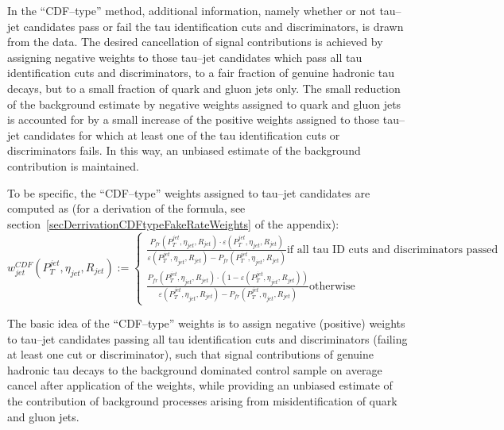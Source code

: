 In the ``CDF--type'' method, additional information, namely whether or not
tau--jet candidates pass or fail the tau identification cuts and discriminators,
is drawn from the data.  The desired cancellation of signal contributions is
achieved by assigning negative weights to those tau--jet candidates which pass
all tau identification cuts and discriminators, \ie to a fair fraction of
genuine hadronic tau decays, but to a small fraction of quark and gluon jets
only.  The small reduction of the background estimate by negative weights
assigned to quark and gluon jets is accounted for by a small increase of the
positive weights assigned to those tau--jet candidates for which at least one of
the tau identification cuts or discriminators fails.  In this way, an unbiased
estimate of the background contribution is maintained.

To be specific, the ``CDF--type'' weights assigned to tau--jet candidates are computed as
(for a derivation of the formula, see section~\ref{secDerrivationCDFtypeFakeRateWeights} of the appendix):
\begin{equation}
w_{jet}^{CDF} \left( P_{T}^{jet}, \eta_{jet}, R_{jet} \right) 
:= 
\begin{cases} 
   \frac{P_{fr} \left( P_{T}^{jet}, \eta_{jet}, R_{jet} \right) \cdot 
         \varepsilon \left( P_{T}^{jet}, \eta_{jet}, R_{jet} \right)}
        {\varepsilon \left( P_{T}^{jet}, \eta_{jet}, R_{jet} \right) - P_{fr} \left( P_{T}^{jet}, \eta_{jet}, R_{jet} \right)}
      \mbox{if all tau ID cuts and discriminators passed} \\
   \frac{P_{fr} \left( P_{T}^{jet}, \eta_{jet}, R_{jet} \right) \cdot 
         \left( 1 - \varepsilon \left( P_{T}^{jet}, \eta_{jet}, R_{jet} \right) \right)}
        {\varepsilon \left( P_{T}^{jet}, \eta_{jet}, R_{jet} \right) - P_{fr} \left( P_{T}^{jet}, \eta_{jet}, R_{jet} \right)}
      \mbox{otherwise}
\end{cases}
\label{eqBgEstFakeRate_frCDFtypeJetWeight}
\end{equation}

The basic idea of the ``CDF--type'' weights is to assign negative (positive)
weights to tau--jet candidates passing all tau identification cuts and
discriminators (failing at least one cut or discriminator), such that signal
contributions of genuine hadronic tau decays to the background dominated control
sample on average cancel after application of the weights, while providing an
unbiased estimate of the contribution of background processes arising from
misidentification of quark and gluon jets.

